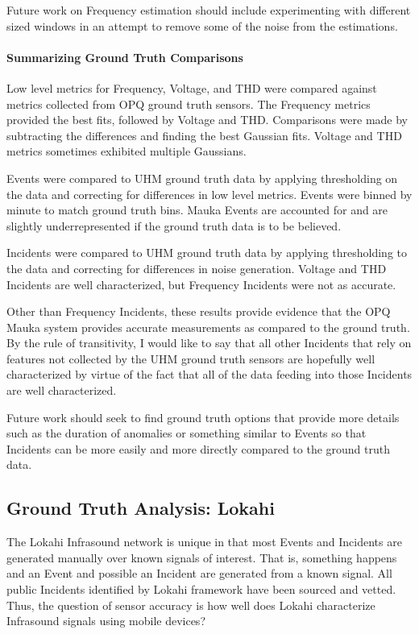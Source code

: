 Future work on Frequency estimation should include experimenting with different sized windows in an attempt to remove some of the noise from the estimations.

\paragraph{Summarizing Ground Truth Comparisons}

Low level metrics for Frequency, Voltage, and THD were compared against metrics collected from OPQ ground truth sensors. The Frequency metrics provided the best fits, followed by Voltage and THD. Comparisons were made by subtracting the differences and finding the best Gaussian fits. Voltage and THD metrics sometimes exhibited multiple Gaussians.

Events were compared to UHM ground truth data by applying thresholding on the data and correcting for differences in low level metrics. Events were binned by minute to match ground truth bins. Mauka Events are accounted for and are slightly underrepresented if the ground truth data is to be believed.

Incidents were compared to UHM ground truth data by applying thresholding to the data and correcting for differences in noise generation. Voltage and THD Incidents are well characterized, but Frequency Incidents were not as accurate.

Other than Frequency Incidents, these results provide evidence that the OPQ Mauka system provides accurate measurements as compared to the ground truth. By the rule of transitivity, I would like to say that all other Incidents that rely on features not collected by the UHM ground truth sensors are hopefully well characterized by virtue of the fact that all of the data feeding into those Incidents are well characterized.

Future work should seek to find ground truth options that provide more details such as the duration of anomalies or something similar to Events so that Incidents can be more easily and more directly compared to the ground truth data.

\subsection{Ground Truth Analysis: Lokahi}\label{subsec:ground-truth-analysis:-lokahi}

The Lokahi Infrasound network is unique in that most Events and Incidents are generated manually over known signals of interest. That is, something happens and an Event and possible an Incident are generated from a known signal. All public Incidents identified by Lokahi framework have been sourced and vetted. Thus, the question of sensor accuracy is how well does Lokahi characterize Infrasound signals using mobile devices?

